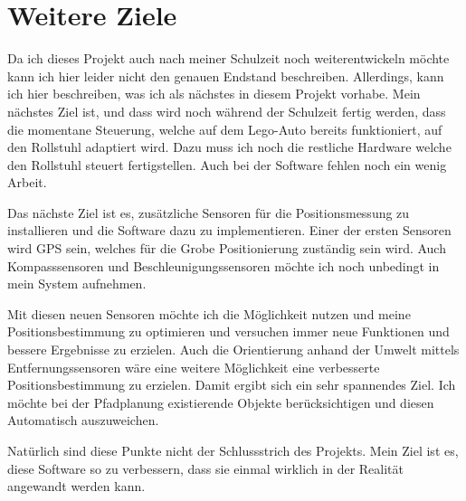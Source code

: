\section{Weitere Ziele}
Da ich dieses Projekt auch nach meiner Schulzeit noch weiterentwickeln möchte kann ich hier leider nicht den genauen Endstand beschreiben.
Allerdings, kann ich hier beschreiben, was ich als nächstes in diesem Projekt vorhabe.
Mein nächstes Ziel ist, und dass wird noch während der Schulzeit fertig werden, dass die momentane Steuerung, welche auf dem Lego-Auto bereits funktioniert, auf den Rollstuhl adaptiert wird.
Dazu muss ich noch die restliche Hardware welche den Rollstuhl steuert fertigstellen.
Auch bei der Software fehlen noch ein wenig Arbeit.

Das nächste Ziel ist es, zusätzliche Sensoren für die Positionsmessung zu installieren und die Software dazu zu implementieren.
Einer der ersten Sensoren wird GPS sein, welches für die Grobe Positionierung zuständig sein wird.
Auch Kompasssensoren und Beschleunigungssensoren möchte ich noch unbedingt in mein System aufnehmen.

Mit diesen neuen Sensoren möchte ich die Möglichkeit nutzen und meine Positionsbestimmung zu optimieren und versuchen immer neue Funktionen und bessere Ergebnisse zu erzielen.
Auch die Orientierung anhand der Umwelt mittels Entfernungssensoren wäre eine weitere Möglichkeit eine verbesserte Positionsbestimmung zu erzielen.
Damit ergibt sich ein sehr spannendes Ziel.
Ich möchte bei der Pfadplanung existierende Objekte berücksichtigen und diesen Automatisch auszuweichen.

Natürlich sind diese Punkte nicht der Schlussstrich des Projekts.
Mein Ziel ist es, diese Software so zu verbessern, dass sie einmal wirklich in der Realität angewandt werden kann.


